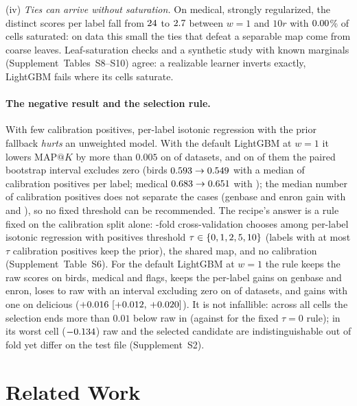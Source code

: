 \documentclass[sigconf,nonacm]{acmart}
\makeatletter
\newcommand{\mapk}{\mathrm{MAP}@K\xspace}
\newcommand{\Supp}[1]{Supplement~#1}  %
\makeatother
\begin{document}
(iv) \emph{Ties can arrive without saturation.} On medical, strongly regularized, the distinct scores per label fall from $24$ to $2.7$ between $w{=}1$ and $10r$ with $0.00$\% of cells saturated: on data this small the ties that defeat a separable map come from coarse leaves. Leaf-saturation checks and a synthetic study with known marginals (\Supp{Tables~S8--S10}) agree: a realizable learner inverts exactly, LightGBM fails where its cells saturate.

\paragraph{The negative result and the selection rule.} With few calibration positives, per-label isotonic regression with the prior fallback \emph{hurts} an unweighted model. With the default LightGBM at $w{=}1$ it lowers $\mapk$ by more than $0.005$ on \nnHurtDefault{} of \nnMulan{} datasets, and on \nnHurtTauZeroCI{} of them the paired bootstrap interval excludes zero (birds $0.593\to0.549$ with a median of \ncalPosMedBirds{} calibration positives per label; medical $0.683\to0.651$ with \ncalPosMedMedical); the median number of calibration positives does not separate the cases (genbase and enron gain with \ncalPosMedGenbase{} and \ncalPosMedEnron), so no fixed threshold can be recommended. The recipe's answer is a rule fixed on the calibration split alone: \ntauFolds-fold cross-validation chooses among per-label isotonic regression with positives threshold $\tau\in\{0, 1, 2, 5, 10\}$ (labels with at most $\tau$ calibration positives keep the prior), the shared map, and no calibration (\Supp{Table~S6}). For the default LightGBM at $w{=}1$ the rule keeps the raw scores on birds, medical and flags, keeps the per-label gains on genbase and enron, loses to raw with an interval excluding zero on \nnHurtAfterTau{} of \nnMulan{} datasets, and gains with one on delicious ($+0.016~[+0.012,\,+0.020]$). It is not infallible: across all \nnTauCells{} cells the selection ends more than $0.01$ below raw in \nnTauSelBelowRaw{} (against \nnTauZeroBelowRaw{} for the fixed $\tau=0$ rule); in its worst cell ($-0.134$) raw and the selected candidate are indistinguishable out of fold yet differ on the test file (\Supp{S2}).

\section{Related Work}
\label{sec:related}
\end{document}
